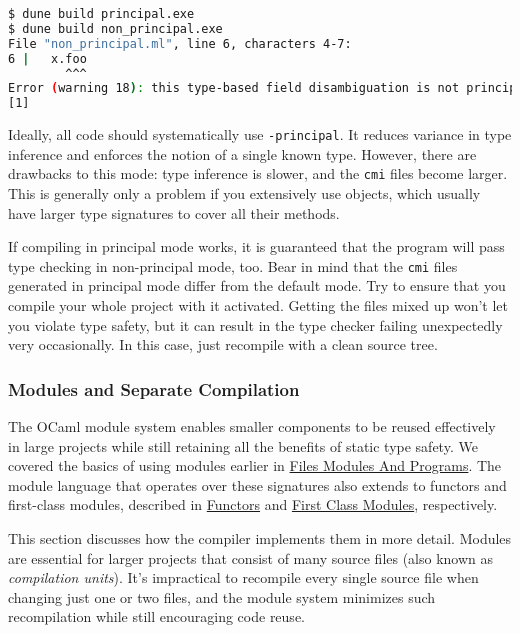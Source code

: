 \begin{lstlisting}[language=bash]
$ dune build principal.exe
$ dune build non_principal.exe
File "non_principal.ml", line 6, characters 4-7:
6 |   x.foo
        ^^^
Error (warning 18): this type-based field disambiguation is not principal.
[1]
\end{lstlisting}

Ideally, all code should systematically use
\passthrough{\lstinline!-principal!}. It reduces variance in type
inference and enforces the notion of a single known type. However, there
are drawbacks to this mode: type inference is slower, and the
\passthrough{\lstinline!cmi!} files become larger. This is generally
only a problem if you extensively use objects, which usually have larger
type signatures to cover all their methods.

If compiling in principal mode works, it is guaranteed that the program
will pass type checking in non-principal mode, too. Bear in mind that
the \passthrough{\lstinline!cmi!} files generated in principal mode
differ from the default mode. Try to ensure that you compile your whole
project with it activated. Getting the files mixed up won't let you
violate type safety, but it can result in the type checker failing
unexpectedly very occasionally. In this case, just recompile with a
clean source tree.

\hypertarget{modules-and-separate-compilation}{%
\subsubsection{Modules and Separate
Compilation}\label{modules-and-separate-compilation}}

The OCaml module system enables smaller components to be reused
effectively in large projects while still retaining all the benefits of
static type safety. We covered the basics of using modules earlier in
\href{files-modules-and-programs.html\#files-modules-and-programs}{Files
Modules And Programs}. The module language that operates over these
signatures also extends to functors and first-class modules, described
in \href{functors.html\#functors}{Functors} and
\href{first-class-modules.html\#first-class-modules}{First Class
Modules}, respectively. 

This section discusses how the compiler implements them in more detail.
Modules are essential for larger projects that consist of many source
files (also known as \emph{compilation units}). It's impractical to
recompile every single source file when changing just one or two files,
and the module system minimizes such recompilation while still
encouraging code reuse. 

